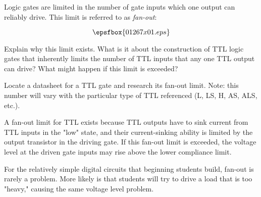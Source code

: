 

Logic gates are limited in the number of gate inputs which one output can reliably drive.  This limit is referred to as {\it fan-out}:

$$\epsfbox{01267x01.eps}$$

Explain why this limit exists.  What is it about the construction of TTL logic gates that inherently limits the number of TTL inputs that any one TTL output can drive?  What might happen if this limit is exceeded?

Locate a datasheet for a TTL gate and research its fan-out limit.  Note: this number will vary with the particular type of TTL referenced (L, LS, H, AS, ALS, etc.).







A fan-out limit for TTL exists because TTL outputs have to sink current from TTL inputs in the "low" state, and their current-sinking ability is limited by the output transistor in the driving gate.  If this fan-out limit is exceeded, the voltage level at the driven gate inputs may rise above the lower compliance limit.







For the relatively simple digital circuits that beginning students build, fan-out is rarely a problem.  More likely is that students will try to drive a load that is too "heavy," causing the same voltage level problem.




